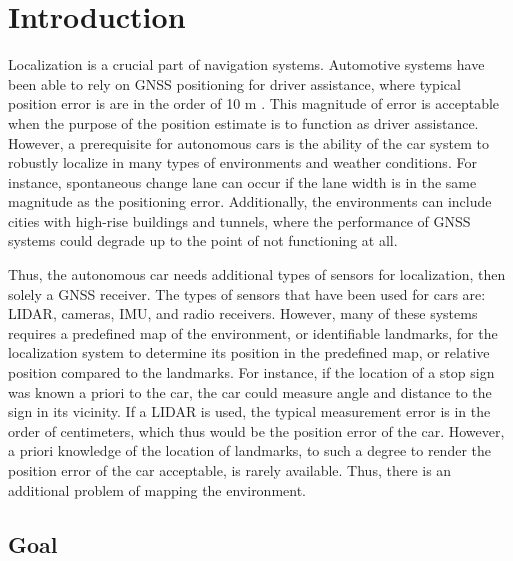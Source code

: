 \section{Introduction}

Localization is a crucial part of navigation systems. Automotive
systems have been able to rely on \gls{GNSS} positioning for driver
assistance, where typical position error is are in the
order of 10 m \cite{4770175}. This magnitude of error is acceptable
when the purpose of the position estimate is to function as driver assistance.
However, a prerequisite for autonomous cars is the ability of the car
system to robustly localize in many types of environments and weather
conditions. For instance, spontaneous change lane can occur if the
lane width is in the same magnitude as the positioning
error. Additionally, the environments can include cities with
high-rise buildings and tunnels, where the performance of \gls{GNSS}
systems could degrade up to the point of not functioning at all.

Thus, the autonomous car needs additional types of sensors for
localization, then solely a \gls{GNSS} receiver. The types of sensors
that have been used for cars are: \gls{LIDAR}, cameras, \gls{IMU}, and
radio receivers. However, many of these systems requires a predefined map of the
environment, or identifiable landmarks, for the localization system to
determine its position in the predefined map, or relative position
compared to the landmarks. For instance, if the location of a stop
sign was known a priori to the car, the car could measure angle and
distance to the sign in its vicinity. If a \gls{LIDAR} is used, the
typical measurement error is in the order of centimeters, which thus
would be the position error of the car. However, a priori knowledge of the location of
landmarks, to such a degree to render the position error of the car
acceptable, is rarely available. Thus, there is an additional problem
of mapping the environment.

\subsection{Goal}

